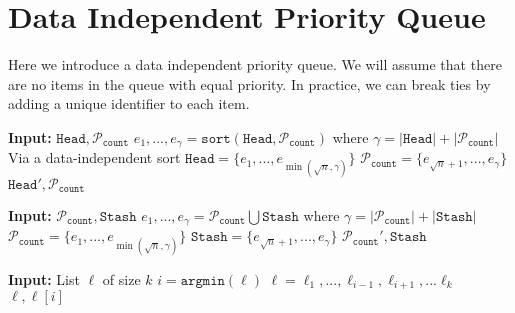 \section{Data Independent Priority Queue}
Here we introduce a data independent priority queue. We will assume that there are no items in the queue
with equal priority. In practice, we can break ties by adding a unique identifier to each item.

\newcommand{\DIPQhead}{\texttt{Head}}
\newcommand{\DIPQstash}{\texttt{Stash}}
\newcommand{\DIPQcounter}{{\texttt{count}}}
\newcommand{\DIPQpartition}{\mathcal{P}}
\newcommand{\MergeFill}{\texttt{MergeFill}}
\newcommand{\Fill}{\texttt{Fill}}
\newcommand{\ExtractSmallest}{\texttt{ExtractSmallest}}
\newcommand{\sqrtn}{{\sqrt{n}}}
\newcommand{\good}{\mathcal{G}}
\newcommand{\bad}{\mathcal{B}}

\begin{algorithm}
	\caption{$\MergeFill$}
	\begin{algorithmic}[1]
			\State \textbf{Input:} $\DIPQhead, \DIPQpartition_\DIPQcounter$
			\State $e_1, ..., e_\gamma = \texttt{sort}(\DIPQhead, \DIPQpartition_\DIPQcounter)$ where $\gamma = |\DIPQhead| + |\DIPQpartition_\DIPQcounter|$ \Comment Via a data-independent sort
			\State $\DIPQhead = \{e_1, ..., e_{\min\left(\sqrtn, \gamma\right)}\}$
			\State $\DIPQpartition_\DIPQcounter = \{e_{\sqrtn + 1}, ..., e_\gamma\}$
			\State \Return $\DIPQhead', \DIPQpartition_\DIPQcounter$
	\end{algorithmic}
\end{algorithm}

\begin{algorithm}
	\caption{$\Fill$}
	\begin{algorithmic}[1]
			\State \textbf{Input:} $\DIPQpartition_\DIPQcounter, \DIPQstash$
			\State $e_1, ..., e_\gamma = \DIPQpartition_\DIPQcounter \bigcup \DIPQstash$ where $\gamma = |\DIPQpartition_\DIPQcounter| + |\DIPQstash|$
			\State $\DIPQpartition_\DIPQcounter = \{e_1, ..., e_{\min(\sqrtn, \gamma)}\}$
			\State $\DIPQstash = \{e_{\sqrtn + 1}, ..., e_\gamma\}$
			\State \Return $\DIPQpartition_\DIPQcounter', \DIPQstash$
	\end{algorithmic}
\end{algorithm}

\begin{algorithm}
	\caption{$\ExtractSmallest$}
	\begin{algorithmic}[1]
			\State \textbf{Input:} List $\ell$ of size $k$
			\State $i = \texttt{argmin}(\ell)$
			\State $\ell = \ell_1, ..., \ell_{i - 1}, \ell_{i + 1}, ... \ell_k$
			\State \Return $\ell, \ell[i]$
	\end{algorithmic}
\end{algorithm}

